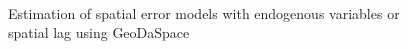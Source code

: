 \documentclass{article}
\begin{document}
\begin{figure}[htb]
\centering
\caption{Estimation of spatial error models with endogenous variables or spatial lag using GeoDaSpace}
\label{f:GS_hom_endog}
 \\
\end{figure}
\end{document}
